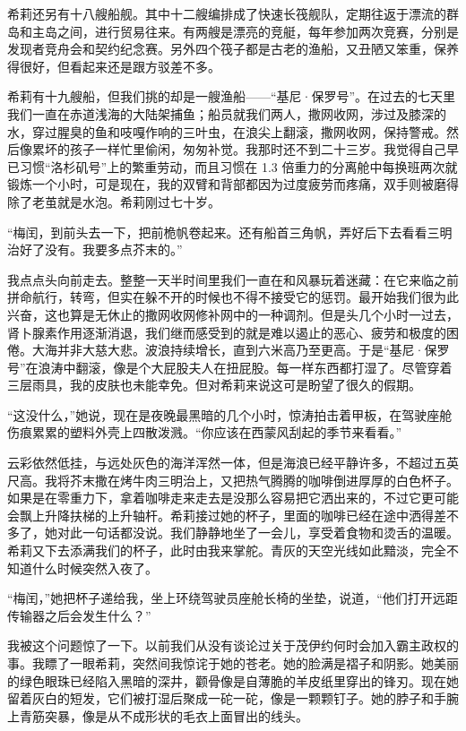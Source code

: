 \documentclass[AutoFakeBold=true]{book}
\begin{document}
希莉还另有十八艘船舰。其中十二艘编排成了快速长筏舰队，定期往返于漂流的群岛和主岛之间，进行贸易往来。有两艘是漂亮的竞艇，每年参加两次竞赛，分别是发现者竞舟会和契约纪念赛。另外四个筏子都是古老的渔船，又丑陋又笨重，保养得很好，但看起来还是跟方驳差不多。

希莉有十九艘船，但我们挑的却是一艘渔船——``基尼·保罗号''。在过去的七天里我们一直在赤道浅海的大陆架捕鱼；船员就我们两人，撒网收网，涉过及膝深的水，穿过腥臭的鱼和吱嘎作响的三叶虫，在浪尖上翻滚，撒网收网，保持警戒。然后像累坏的孩子一样忙里偷闲，匆匆补觉。我那时还不到二十三岁。我觉得自己早已习惯``洛杉矶号''上的繁重劳动，而且习惯在 1.3 倍重力的分离舱中每换班两次就锻炼一个小时，可是现在，我的双臂和背部都因为过度疲劳而疼痛，双手则被磨得除了老茧就是水泡。希莉刚过七十岁。

``梅闰，到前头去一下，把前桅帆卷起来。还有船首三角帆，弄好后下去看看三明治好了没有。我要多点芥末的。''

我点点头向前走去。整整一天半时间里我们一直在和风暴玩着迷藏：在它来临之前拼命航行，转弯，但实在躲不开的时候也不得不接受它的惩罚。最开始我们很为此兴奋，这也算是无休止的撒网收网修补网中的一种调剂。但是头几个小时一过去，肾卜腺素作用逐渐消退，我们继而感受到的就是难以遏止的恶心、疲劳和极度的困倦。大海并非大慈大悲。波浪持续增长，直到六米高乃至更高。于是``基尼·保罗号''在浪涛中翻滚，像是个大屁股夫人在扭屁股。每一样东西都打湿了。尽管穿着三层雨具，我的皮肤也未能幸免。但对希莉来说这可是盼望了很久的假期。

``这没什么，''她说，现在是夜晚最黑暗的几个小时，惊涛拍击着甲板，在驾驶座舱伤痕累累的塑料外壳上四散泼溅。``你应该在西蒙风刮起的季节来看看。''

云彩依然低挂，与远处灰色的海洋浑然一体，但是海浪已经平静许多，不超过五英尺高。我将芥末撒在烤牛肉三明治上，又把热气腾腾的咖啡倒进厚厚的白色杯子。如果是在零重力下，拿着咖啡走来走去是没那么容易把它洒出来的，不过它更可能会飘上升降扶梯的上升轴杆。希莉接过她的杯子，里面的咖啡已经在途中洒得差不多了，她对此一句话都没说。我们静静地坐了一会儿，享受着食物和烫舌的温暖。希莉又下去添满我们的杯子，此时由我来掌舵。青灰的天空光线如此黯淡，完全不知道什么时候突然入夜了。

``梅闰，''她把杯子递给我，坐上环绕驾驶员座舱长椅的坐垫，说道，``他们打开远距传输器之后会发生什么？''

我被这个问题惊了一下。以前我们从没有谈论过关于茂伊约何时会加入霸主政权的事。我瞟了一眼希莉，突然间我惊诧于她的苍老。她的脸满是褶子和阴影。她美丽的绿色眼珠已经陷入黑暗的深井，颧骨像是自薄脆的羊皮纸里穿出的锋刃。现在她留着灰白的短发，它们被打湿后聚成一砣一砣，像是一颗颗钉子。她的脖子和手腕上青筋突暴，像是从不成形状的毛衣上面冒出的线头。
\end{document}
